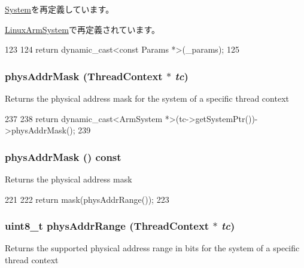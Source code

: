 \hyperlink{classSystem_acd3c3feb78ae7a8f88fe0f110a718dff}{System}を再定義しています。

\hyperlink{classLinuxArmSystem_acd3c3feb78ae7a8f88fe0f110a718dff}{LinuxArmSystem}で再定義されています。


\begin{DoxyCode}
123     {
124         return dynamic_cast<const Params *>(_params);
125     }
\end{DoxyCode}
\hypertarget{classArmSystem_a9b41efe55e6e2a1ee6f8a44325c8213e}{
\subsubsection[{physAddrMask}]{ physAddrMask ({\bf ThreadContext} $\ast$ {\em tc})}}
\label{classArmSystem_a9b41efe55e6e2a1ee6f8a44325c8213e}
Returns the physical address mask for the system of a specific thread context 


\begin{DoxyCode}
237 {
238     return dynamic_cast<ArmSystem *>(tc->getSystemPtr())->physAddrMask();
239 }
\end{DoxyCode}
\hypertarget{classArmSystem_a09d9a6ae0ebdd88ccfccc513e2157aef}{
\subsubsection[{physAddrMask}]{ physAddrMask () const}}
\label{classArmSystem_a09d9a6ae0ebdd88ccfccc513e2157aef}
Returns the physical address mask 


\begin{DoxyCode}
221     {
222         return mask(physAddrRange());
223     }
\end{DoxyCode}
\hypertarget{classArmSystem_aa5d9f7bf62fd42274745654e63b0fbf8}{
\subsubsection[{physAddrRange}]{\setlength{\rightskip}{0pt plus 5cm}uint8\_\-t physAddrRange ({\bf ThreadContext} $\ast$ {\em tc})}}
\label{classArmSystem_aa5d9f7bf62fd42274745654e63b0fbf8}
Returns the supported physical address range in bits for the system of a specific thread context 


